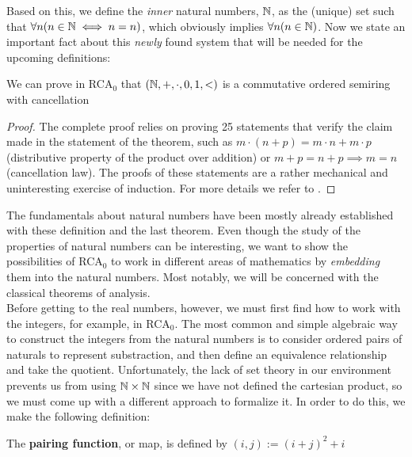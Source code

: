 \documentclass[../main.tex]{memoir}
\begin{document}
Based on this, we define the \textit{inner} natural numbers, $\Bbb{N}$, as the (unique) set such that $\forall n (n \in \Bbb{N} \iff n = n)$, which obviously implies $\forall n (n \in \Bbb{N})$. Now we state an important fact about this \textit{newly} found system that will be needed for the upcoming definitions:

\begin{theorem}
  \label{thm:natural-properties}
  We can prove in RCA$_0$ that $(\Bbb{N}, +, \cdot, 0, 1, <)$ is a commutative ordered semiring with cancellation
\end{theorem}
\begin{proof}
  The complete proof relies on proving 25 statements that verify the claim made in the statement of the theorem, such as $m \cdot (n + p) = m \cdot n + m \cdot p$ (distributive property of the product over addition) or $m + p = n + p \implies m = n$ (cancellation law). The proofs of these statements are a rather mechanical and uninteresting exercise of induction. For more details we refer to \cite{simpson}.
\end{proof}

The fundamentals about natural numbers have been mostly already established with these definition and the last theorem. Even though the study of the properties of natural numbers can be interesting, we want to show the possibilities of RCA$_0$ to work in different areas of mathematics by \textit{embedding} them into the natural numbers. Most notably, we will be concerned with the classical theorems of analysis. \\

Before getting to the real numbers, however, we must first find how to work with the integers, for example, in RCA$_0$. The most common and simple algebraic way to construct the integers from the natural numbers is to consider ordered pairs of naturals to represent substraction, and then define an equivalence relationship and take the quotient. Unfortunately, the lack of set theory in our environment prevents us from using $\Bbb{N} \times \Bbb{N}$ since we have not defined the cartesian product, so we must come up with a different approach to formalize it. In order to do this, we make the following definition:

\begin{definition}
  The \textbf{pairing function}, or map, is defined by $(i, j) := (i + j)^2 + i$
\end{definition}
\end{document}
